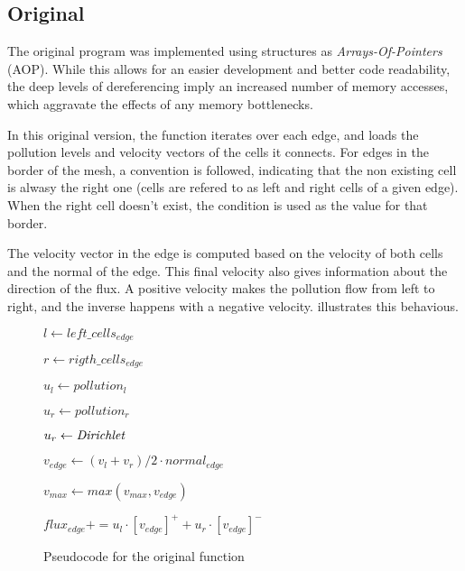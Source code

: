 \subsection{Original}
\label{sec:310}

The original \polu program was implemented using structures as \textit{Arrays-Of-Pointers} (AOP). While this allows for an easier development and better code readability, the deep levels of dereferencing imply an increased number of memory accesses, which aggravate the effects of any memory bottlenecks.

In this original version, the \computeflux function iterates over each edge, and loads the pollution levels and velocity vectors of the cells it connects. For edges in the border of the mesh, a convention is followed, indicating that the non existing cell is alwasy the right one (cells are refered to as left and right cells of a given edge). When the right cell doesn't exist, the \dirichlet condition is used as the value for that border.

The velocity vector in the edge is computed based on the velocity of both cells and the normal of the edge. This final velocity also gives information about the direction of the flux. A positive velocity makes the pollution flow from left to right, and the inverse happens with a negative velocity.  illustrates this behavious.



\begin{figure}[!htp]
	\begin{alg}

			$l     \gets left\_cells_{edge}$

			$r     \gets rigth\_cells_{edge}$

			$u_{l} \gets pollution_{l}$


				$u_{r} \gets pollution_{r}$
			\Else

				$u_{r} \gets \textit{Dirichlet}$ 
			\EndIf
			
			$v_{edge} \gets (v_{l} + v_{r}) / 2 \cdot normal_{edge}$

			$v_{max} \gets max(v_{max}, v_{edge})$

			$flux_{edge} += u_{l} \cdot [v_{edge}]^{+} + u_{r} \cdot [v_{edge}]^{-}$
		\EndFor
	\end{alg}

	\caption{Pseudocode for the original \computeflux function}
	\label{alg:flux}
\end{figure}

